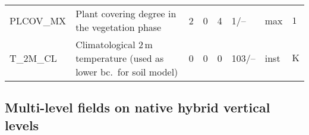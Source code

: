 \begin{table}[H]
\begin{tabular}{p{2.0cm}p{5.0cm}p{0.7cm}p{0.7cm}p{0.7cm}p{1.4cm}p{1cm}p{1cm}}
PLCOV\_MX                     &  Plant covering degree in the vegetation phase                                          &               2                                   &                       0                     &                    4                       &                 1/--                            &                      max                    &        $1$ \\
T\_2M\_CL                     &  Climatological $2\,\mathrm{m}$ temperature (used as lower bc.\ for soil model)         &               0                                   &                       0                     &                    0                       &               103/--                            &                      inst                   &        $\mathrm{K}$ \\
  \bottomrule
 \end{tabular}
\end{table}



\subsection{Multi-level fields on native hybrid vertical levels}

